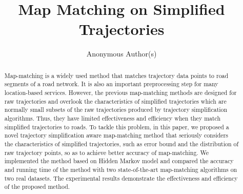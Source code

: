 \documentclass[sigconf]{acmart}
\begin{document}
\title{Map Matching on Simplified Trajectories}



\author{Anonymous Author(s)}





\renewcommand{\shortauthors}{XXX et al.}


\begin{abstract}
Map-matching is a {widely} used method that matches trajectory
data points to road segments of a road network. It is also an important
preprocessing step for many location-based services. However, the previous
map-matching methods are designed for raw trajectories and overlook the
{characteristics} of simplified trajectories which are normally small subsets of the raw trajectories produced by trajectory simplification algorithms. Thus, they have limited effectiveness and efficiency when they match simplified trajectories to roads.
To tackle this problem, in this paper, we proposed a novel trajectory
simplification aware map-matching method that seriously considers the
{characteristics} of simplified trajectories, such as error bound and the distribution of raw trajectory points, so as to achieve better accuracy of map-matching.
We implemented the method based on Hidden Markov model and compared the accuracy and running time of the method with two state-of-the-art map-matching algorithms on two real datasets. The experimental results demonstrate the effectiveness and efficiency of the proposed method.
\end{abstract}
\end{document}
